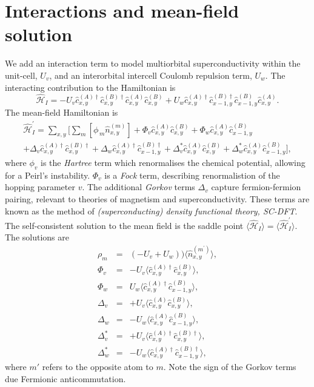 \section{Interactions and mean-field solution}
We add an interaction term to model multiorbital superconductivity within the unit-cell, $U_v$, and an interorbital intercell Coulomb repulsion term, $U_w$. The interacting contribution to the Hamiltonian is 
\begin{equation}
    \hat{\mathcal{H}}_{ I }=
    -U_v \hat{c}^{ (A) \dagger}_{ x,y }\hat{c}^{ (B) \dagger}_{ x,y } \hat{c}^{ (A) }_{ x,y }\hat{c}^{ (B) }_{ x,y }
    +U_w \hat{c}^{ (A) \dagger }_{ x,y }\hat{c}^{ (B) \dagger}_{ x-1,y } \hat{c}^{ (B) }_{ x-1,y }\hat{c}^{ (A) }_{ x,y }
.
\end{equation}
The mean-field Hamiltonian is
\begin{multline}
    \hat{\mathcal{H}}^{'}_{ I }=
    \sum_{x,y}\Bigg[
    \sum_m\left[\phi_{\,m}\hat{n}^{ (m) }_{ x,y }\right]
    +\Phi_v \hat{c}^{ (A) }_{ x,y }\hat{c}^{ (B) }_{ x,y }
    +\Phi_w \hat{c}^{ (A) }_{ x,y }\hat{c}^{ (B) }_{ x-1,y }
    \\
    +\Delta_v \hat{c}^{ (A) \dagger}_{ x,y }\hat{c}^{ (B) \dagger }_{ x,y }
    +\Delta_w \hat{c}^{ (A) \dagger}_{ x,y }\hat{c}^{ (B) \dagger }_{ x-1,y }
    +\Delta_v^* \hat{c}^{ (A) }_{ x,y }\hat{c}^{ (B) }_{ x,y }
    +\Delta_w^* \hat{c}^{ (A) }_{ x,y }\hat{c}^{ (B) }_{ x-1,y }
    \Bigg],
\end{multline}
where $\phi_v$ is the {\it Hartree} term which renormalises the chemical potential, allowing for a Peirl's instability. 
$\Phi_v$ is a {\it Fock} term, describing renormalistion of the hopping parameter $v$.
The additional {\it Gorkov} terms $\Delta_v$ capture fermion-fermion pairing, relevant to theories of magnetism and superconductivity.
These terms are known as the method of {\it (superconducting) density functional theory, SC-DFT}. 
The self-consistent solution to the mean field is the saddle point 
$\langle\hat{\mathcal{H}}_{ I }\rangle = \langle\hat{\mathcal{H}}^{'}_{ I }\rangle$.
The solutions are
\begin{eqnarray}
    \rho_{m} &=& (-U_v+U_w))\langle\hat{n}^{ (m^{'}) }_{ x,y }\rangle,\\
    \Phi_v &=& -U_v\langle\hat{c}^{ (A) \dagger }_{ x,y }\hat{c}^{ (B) }_{ x,y }\rangle,\\
    \Phi_w &=& U_w\langle\hat{c}^{ (A) \dagger }_{ x,y }\hat{c}^{ (B) }_{ x-1,y }\rangle,\\
    \Delta_v &=& +U_v\langle\hat{c}^{ (A) }_{ x,y }\hat{c}^{ (B) }_{ x,y }\rangle,\\
    \Delta_w &=& -U_w\langle\hat{c}^{ (A) }_{ x,y }\hat{c}^{ (B) }_{ x-1,y }\rangle,\\
    \Delta_v^* &=& +U_v\langle \hat{c}^{ (A) \dagger}_{ x,y }\hat{c}^{ (B) \dagger }_{ x,y }\rangle,\\
    \Delta_w^* &=& -U_w\langle \hat{c}^{ (A) \dagger}_{ x,y }\hat{c}^{ (B) \dagger }_{ x-1,y }\rangle,
\end{eqnarray}
where $m'$ refers to the opposite atom to $m$. 
Note the sign of the Gorkov terms due Fermionic anticommutation.

